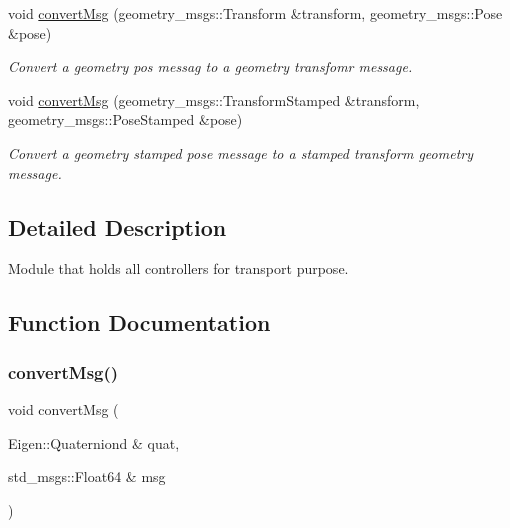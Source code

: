 \begin{DoxyCompactItemize}
void \hyperlink{group__transport__controller_ga27bedbf17c4aa6e228239ef1f1009e2b}{convert\+Msg} (geometry\+\_\+msgs\+::\+Transform \&transform, geometry\+\_\+msgs\+::\+Pose \&pose)
\begin{DoxyCompactList}\small\item\em Convert a geometry pos messag to a geometry transfomr message. \end{DoxyCompactList}\item 
void \hyperlink{group__transport__controller_ga83f417b8e164774e4926508549543498}{convert\+Msg} (geometry\+\_\+msgs\+::\+Transform\+Stamped \&transform, geometry\+\_\+msgs\+::\+Pose\+Stamped \&pose)
\begin{DoxyCompactList}\small\item\em Convert a geometry stamped pose message to a stamped transform geometry message. \end{DoxyCompactList}\end{DoxyCompactItemize}


\subsection{Detailed Description}
Module that holds all controllers for transport purpose. 



\subsection{Function Documentation}
\mbox{\label{group__transport__controller_ga465b07e16106af072ed5315010fa876c}} 
\subsubsection{\texorpdfstring{convert\+Msg()}{convertMsg()}\hspace{0.1cm}{\footnotesize\ttfamily [1/13]}}
{\footnotesize\ttfamily void convert\+Msg (\begin{DoxyParamCaption}\item[{Eigen\+::\+Quaterniond \&}]{quat,  }\item[{std\+\_\+msgs\+::\+Float64 \&}]{msg }\end{DoxyParamCaption})}



